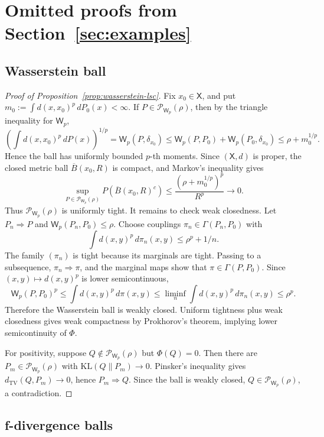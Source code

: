 \documentclass[11pt]{article}
\newcommand{\KL}{\mathrm{KL}}
\newcommand{\Pcal}{\mathcal{P}}
\newcommand{\X}{\mathsf{X}}
\newcommand{\TV}{\mathrm{TV}}
\newcommand{\Wass}{\mathsf W}
\newcommand{\dd}{d}
\theoremstyle{definition}
\theoremstyle{definition}
\begin{document}
\printbibliography
\appendix





\section{Omitted proofs from Section~\ref{sec:examples}}

\subsection{Wasserstein ball}

\begin{proof}[Proof of Proposition~\ref{prop:wasserstein-lsc}]
Fix \(x_0\in\X\), and put \(m_0:=\int d(x,x_0)^p\,\dd P_0(x)<\infty\).  If \(P\in\Pcal_{\Wass_p}(\rho)\), then by the triangle inequality for \(\Wass_p\),
\[
  \left(\int d(x,x_0)^p\,\dd P(x)\right)^{1/p}
  =\Wass_p(P,\delta_{x_0})
  \le \Wass_p(P,P_0)+\Wass_p(P_0,\delta_{x_0})
  \le \rho+m_0^{1/p}.
\]
Hence the ball has uniformly bounded \(p\)-th moments.  Since \((\X,d)\) is proper, the closed metric ball \(\overline B(x_0,R)\) is compact, and Markov's inequality gives
\[
  \sup_{P\in\Pcal_{\Wass_p}(\rho)}P(\overline B(x_0,R)^c)
  \le \frac{(\rho+m_0^{1/p})^p}{R^p}
  \to0.
\]
Thus \(\Pcal_{\Wass_p}(\rho)\) is uniformly tight.
It remains to check weak closedness.  Let \(P_n\Rightarrow P\) and \(\Wass_p(P_n,P_0)\le\rho\).  Choose couplings \(\pi_n\in\Gamma(P_n,P_0)\) with
\[
  \int d(x,y)^p\,\dd\pi_n(x,y)\le \rho^p+1/n.
\]
The family \((\pi_n)\) is tight because its marginals are tight.  Passing to a subsequence, \(\pi_n\Rightarrow\pi\), and the marginal maps show that \(\pi\in\Gamma(P,P_0)\).  Since \((x,y)\mapsto d(x,y)^p\) is lower semicontinuous,
\[
  \Wass_p(P,P_0)^p
  \le \int d(x,y)^p\,\dd\pi(x,y)
  \le \liminf_n\int d(x,y)^p\,\dd\pi_n(x,y)
  \le \rho^p.
\]
Therefore the Wasserstein ball is weakly closed.  Uniform tightness plus weak closedness gives weak compactness by Prokhorov's theorem, implying lower semicontinuity of \(\Phi\).

For positivity, suppose \(Q\notin\Pcal_{\Wass_p}(\rho)\) but \(\Phi(Q)=0\).  Then there are \(P_m\in\Pcal_{\Wass_p}(\rho)\) with \(\KL(Q\|P_m)\to0\).  Pinsker's inequality gives \(d_{\TV}(Q,P_m)\to0\), hence \(P_m\Rightarrow Q\).  Since the ball is weakly closed, \(Q\in\Pcal_{\Wass_p}(\rho)\), a contradiction.
\end{proof}


\subsection{f-divergence balls}
\end{document}
